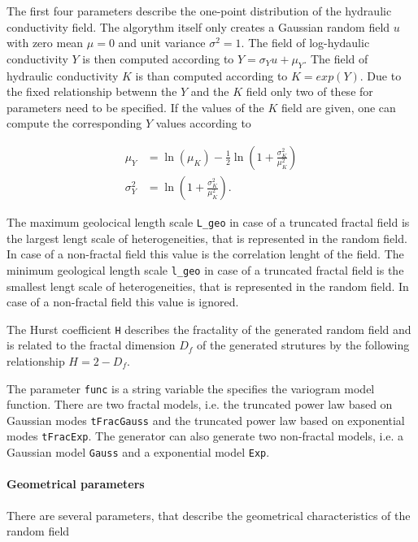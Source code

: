 \documentclass[12pt]{report}
\begin{document}
The first four parameters describe the one-point distribution of the hydraulic conductivity field. The algorythm itself only creates a Gaussian random field $u$ with zero mean $\mu = 0$ and unit variance $\sigma^2 = 1$. The field of log-hydaulic conductivity $Y$ is then computed according to $Y = \sigma_Y u + \mu_Y$. The field of hydraulic conductivity $K$ is than computed according to $K = exp(Y)$. Due to the fixed relationship betwenn the $Y$ and the $K$ field only two of these for parameters need to be specified. If the values of the $K$ field are given, one can compute the corresponding $Y$ values according to 

\begin{subequations}
\begin{align}
	\mu_Y & = \ln(\mu_K) - \frac12\ln \left( 1 + \frac{\sigma^2_K}{\mu_K^2} \right) \\
	\sigma^2_Y & = \ln\left( 1 + \frac{\sigma^2_K}{\mu_K^2} \right).
\end{align}
\end{subequations}

The maximum geolocical length scale {\tt L\_geo} in case of a truncated fractal field is the largest lengt scale of heterogeneities, that is represented in the random field. In case of a non-fractal field this value is the correlation lenght of the field. The minimum geological length scale {\tt l\_geo} in case of a truncated fractal field is the smallest lengt scale of heterogeneities, that is represented in the random field. In case of a non-fractal field this value is ignored. 

The Hurst coefficient {\tt H} describes the fractality of the generated random field and is related to the fractal dimension $D_f$ of the generated strutures by the following relationship $H = 2 - D_f$.

The parameter {\tt func} is a string variable the specifies the variogram model function. There are two fractal models, i.e. the truncated power law based on Gaussian modes {\tt tFracGauss} and the truncated power law based on exponential modes {\tt tFracExp}. The generator can also generate two non-fractal models, i.e. a Gaussian model {\tt Gauss} and a exponential model {\tt Exp}.

\paragraph{Geometrical parameters}

There are several parameters, that describe the geometrical characteristics of the random field
\end{document}
